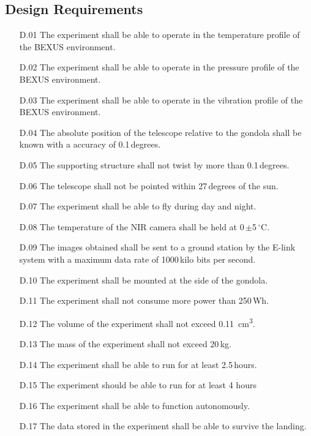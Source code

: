 \subsection{Design Requirements}

\begin{enumerate}
	\item[D.01] The experiment shall be able to operate in the temperature profile of the BEXUS environment.
	\item[D.02] The experiment shall be able to operate in the pressure profile of the BEXUS environment.
    \item[D.03] The experiment shall be able to operate in the vibration profile of the BEXUS environment.
    \item[D.04] The absolute position of the telescope relative to the gondola shall be known with a accuracy of 0.1\,degrees.
	\item[D.05] The supporting structure shall not twist by more than 0.1\,degrees.
	\item[D.06] The telescope shall not be pointed within 27\,degrees of the sun.
	\item[D.07] The experiment shall be able to fly during day and night.
	\item[D.08] The temperature of the NIR camera shall be held at 0\,$\pm$5\,$^\circ$C.
	\item[D.09] The images obtained shall be sent to a ground station by the E-link system with a maximum data rate of 1000\,kilo bits per second.
	\item[D.10] The experiment shall be mounted at the side of the gondola.
	\item[D.11] The experiment shall not consume more power than 250\,Wh.
    \item[D.12] The volume of the experiment shall not exceed \SI{0.11}{cm\cubed}.
    \item[D.13] The mass of the experiment shall not exceed 20\,kg.
    \item[D.14] The experiment shall be able to run for at least 2.5\,hours.
    \item [D.15] The experiment should be able to run for at least 4 hours
    \item[D.16] The experiment shall be able to function autonomously.
    \item[D.17] The data stored in the experiment shall be able to survive the landing.
\end{enumerate}
